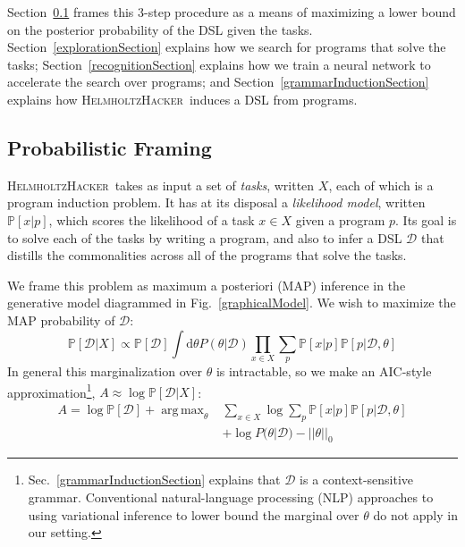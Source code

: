 \documentclass{article}
\newcommand{\system}{\textsc{HelmholtzHacker}~}
\DeclareMathOperator*{\argmax}{arg\,max} %
\newcommand{\probability}{\mathds{P}} %
\begin{document}
Section~\ref{mathematicalFraming} frames this 3-step procedure as
a means of maximizing a lower bound on the posterior probability of the DSL given the tasks.
Section~\ref{explorationSection} explains how we search for programs that solve the tasks;
Section~\ref{recognitionSection} explains how we train a neural network to accelerate the search over programs; and
Section~\ref{grammarInductionSection} explains how \system induces a DSL from programs.

\subsection{Probabilistic Framing}\label{mathematicalFraming}

\system takes as input a set of \emph{tasks}, written $X$, each of which is a program induction problem.
It has at its disposal a \emph{likelihood model}, written $\probability[x|p]$, which scores the likelihood of a task $x\in X$ given a program $p$.
Its goal is to solve each of the tasks by writing a program,
and also to infer a DSL $\mathcal{D}$ that distills the commonalities across all of the programs that solve the tasks.

We frame this problem as maximum a posteriori (MAP) inference in the generative model diagrammed in Fig.~\ref{graphicalModel}. We wish to maximize the MAP probability of $\mathcal{D}$:
\begin{equation*}
  \probability[\mathcal{D}|X]\propto \probability[\mathcal{D}] \int \mathrm{d}\theta P(\theta|\mathcal{D})\prod_{x\in X} \sum_p \probability[x|p]\probability[p|\mathcal{D},\theta]
\end{equation*}
In general this marginalization over $\theta$ is intractable, so we make an AIC-style approximation\footnote{Sec.~\ref{grammarInductionSection} explains that $\mathcal{D}$ is a context-sensitive grammar.
Conventional natural-language processing (NLP) approaches to using variational inference to lower bound the marginal over $\theta$ do not apply in our setting.}, $A\approx \log\probability[\mathcal{D}|X] $:
\begin{align}
  A =   \log \probability[\mathcal{D}] + \argmax_{\theta}& \sum_{x\in X}\log \sum_p\probability[x|p]\probability[p|\mathcal{D},\theta]\nonumber\\
&+  \log P(\theta|\mathcal{D}) - ||\theta||_0 \label{AIC}
  \end{align}
\end{document}
